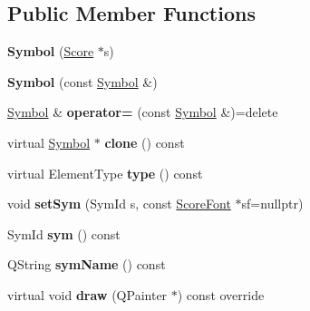 \subsection*{Public Member Functions}
\begin{DoxyCompactItemize}
\item 
\mbox{\label{class_ms_1_1_symbol_ae070484f627b7caddd7a3c059dd99bc4}} 
{\bfseries Symbol} (\hyperlink{class_ms_1_1_score}{Score} $\ast$s)
\item 
\mbox{\label{class_ms_1_1_symbol_a3ad672db26c91ececbf83bff5ed50936}} 
{\bfseries Symbol} (const \hyperlink{class_ms_1_1_symbol}{Symbol} \&)
\item 
\mbox{\label{class_ms_1_1_symbol_a629c6505923d9dddd55979d9463b13ed}} 
\hyperlink{class_ms_1_1_symbol}{Symbol} \& {\bfseries operator=} (const \hyperlink{class_ms_1_1_symbol}{Symbol} \&)=delete
\item 
\mbox{\label{class_ms_1_1_symbol_a39abc62da944855e20c4a2801e533635}} 
virtual \hyperlink{class_ms_1_1_symbol}{Symbol} $\ast$ {\bfseries clone} () const
\item 
\mbox{\label{class_ms_1_1_symbol_a8a18266b1cb5df3980dee0f605f2ce70}} 
virtual Element\+Type {\bfseries type} () const
\item 
\mbox{\label{class_ms_1_1_symbol_a8bdcb14946131e86765ad084386f3f54}} 
void {\bfseries set\+Sym} (Sym\+Id s, const \hyperlink{class_ms_1_1_score_font}{Score\+Font} $\ast$sf=nullptr)
\item 
\mbox{\label{class_ms_1_1_symbol_ae09d7e85fc5274d20e74cc57e191656f}} 
Sym\+Id {\bfseries sym} () const
\item 
\mbox{\label{class_ms_1_1_symbol_ac124fba8c9604b96c95779f39fe33b97}} 
Q\+String {\bfseries sym\+Name} () const
\item 
\mbox{\label{class_ms_1_1_symbol_afca5e06bed0c5b4aea3c02b3e1ecdbd5}} 
virtual void {\bfseries draw} (Q\+Painter $\ast$) const override
\item 

\end{DoxyCompactItemize}
